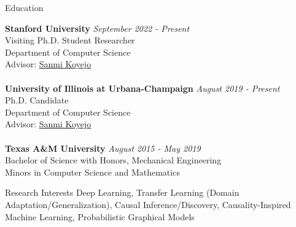 \documentclass{resume} %
\begin{document}
\singlespacing


\begin{rSection}{Education}

{\bf Stanford University} \hfill {\em September 2022 - Present} 
\\ Visiting Ph.D. Student Researcher
\\ Department of Computer Science
\\Advisor: \href{http://sanmi.cs.illinois.edu/}{Sanmi Koyejo}\\
\\{\bf University of Illinois at Urbana-Champaign} \hfill {\em August 2019 - Present} 
\\ Ph.D. Candidate
\\ Department of Computer Science
\\Advisor: \href{http://sanmi.cs.illinois.edu/}{Sanmi Koyejo}\\
\\{\bf Texas A\&M University} \hfill {\em August 2015 - May 2019} 
\\ Bachelor of Science with Honors, Mechanical Engineering
\\ Minors in Computer Science and Mathematics
\end{rSection}

\begin{rSection}{Research Interests}
Deep Learning, Transfer Learning (Domain Adaptation/Generalization), Causal Inference/Discovery, Causality-Inspired Machine Learning, Probabilistic Graphical Models
\end{rSection}
\end{document}
